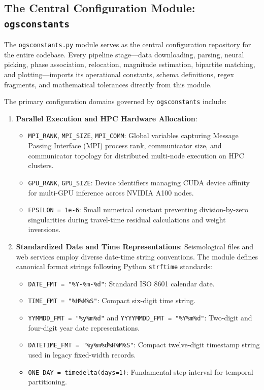 \subsection{The Central Configuration Module: \texttt{ogsconstants}}
\label{sec:ogsconstants}

The \texttt{ogsconstants.py} module serves as the central configuration repository for the entire codebase. Every pipeline stage—data downloading, parsing, neural picking, phase association, relocation, magnitude estimation, bipartite matching, and plotting—imports its operational constants, schema definitions, regex fragments, and mathematical tolerances directly from this module.

The primary configuration domains governed by \texttt{ogsconstants} include:
\begin{enumerate}
  \item \textbf{Parallel Execution and HPC Hardware Allocation}:
  \begin{itemize}
    \item \texttt{MPI\_RANK}, \texttt{MPI\_SIZE}, \texttt{MPI\_COMM}: Global variables capturing Message Passing Interface (\ac{MPI}) process rank, communicator size, and communicator topology for distributed multi-node execution on HPC clusters.
    \item \texttt{GPU\_RANK}, \texttt{GPU\_SIZE}: Device identifiers managing CUDA device affinity for multi-GPU inference across NVIDIA A100 nodes.
    \item \texttt{EPSILON = 1e-6}: Small numerical constant preventing division-by-zero singularities during travel-time residual calculations and weight inversions.
  \end{itemize}

  \item \textbf{Standardized Date and Time Representations}:
  Seismological files and web services employ diverse date-time string conventions. The module defines canonical format strings following Python \texttt{strftime} standards:
  \begin{itemize}
    \item \texttt{DATE\_FMT = "\%Y-\%m-\%d"}: Standard ISO 8601 calendar date.
    \item \texttt{TIME\_FMT = "\%H\%M\%S"}: Compact six-digit time string.
    \item \texttt{YYMMDD\_FMT = "\%y\%m\%d"} and \texttt{YYYYMMDD\_FMT = "\%Y\%m\%d"}: Two-digit and four-digit year date representations.
    \item \texttt{DATETIME\_FMT = "\%y\%m\%d\%H\%M\%S"}: Compact twelve-digit timestamp string used in legacy fixed-width records.
    \item \texttt{ONE\_DAY = timedelta(days=1)}: Fundamental step interval for temporal partitioning.
  \end{itemize}


\end{enumerate}

